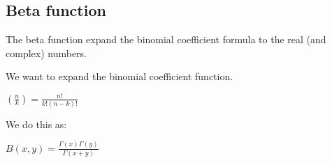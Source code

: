 
\subsection{Beta function}

The beta function expand the binomial coefficient formula to the real (and complex) numbers.

We want to expand the binomial coefficient function.

\((\frac{n}{k})=\frac{n!}{k!(n-k)!}\)

We do this as:

\(B(x, y)=\frac{\Gamma(x)\Gamma(y)}{\Gamma(x+y)}\)

